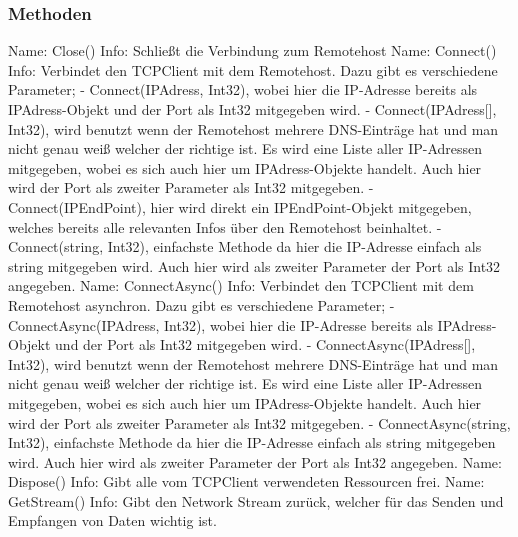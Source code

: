 \subsubsection{Methoden}
Name: Close()
\newline
Info: Schließt die Verbindung zum Remotehost
\newline
\newline
Name: Connect()
\newline
Info: Verbindet den TCPClient mit dem Remotehost. Dazu gibt es verschiedene Parameter; 
\newline \tab \newline
- Connect(IPAdress, Int32), wobei hier die IP-Adresse bereits als IPAdress-Objekt und der Port als Int32 mitgegeben wird.
\newline \tab \newline
- Connect(IPAdress[], Int32), wird benutzt wenn der Remotehost mehrere DNS-Einträge hat und man nicht genau weiß welcher der richtige ist. Es wird eine Liste aller IP-Adressen mitgegeben, wobei es sich auch hier um IPAdress-Objekte handelt. Auch hier wird der Port als zweiter Parameter als Int32 mitgegeben.
\newline \tab \newline
- Connect(IPEndPoint), hier wird direkt ein IPEndPoint-Objekt mitgegeben, welches bereits alle relevanten Infos über den Remotehost beinhaltet.
\newline \tab \newline
- Connect(string, Int32), einfachste Methode da hier die IP-Adresse einfach als string mitgegeben wird. Auch hier wird als zweiter Parameter der Port als Int32 angegeben.
\newline
\newline
Name: ConnectAsync()
Info: Verbindet den TCPClient mit dem Remotehost asynchron. Dazu gibt es verschiedene Parameter; 
\newline \tab \newline
- ConnectAsync(IPAdress, Int32), wobei hier die IP-Adresse bereits als IPAdress-Objekt und der Port als Int32 mitgegeben wird.
\newline \tab \newline
- ConnectAsync(IPAdress[], Int32), wird benutzt wenn der Remotehost mehrere DNS-Einträge hat und man nicht genau weiß welcher der richtige ist. Es wird eine Liste aller IP-Adressen mitgegeben, wobei es sich auch hier um IPAdress-Objekte handelt. Auch hier wird der Port als zweiter Parameter als Int32 mitgegeben.
\newline \tab \newline
- ConnectAsync(string, Int32), einfachste Methode da hier die IP-Adresse einfach als string mitgegeben wird. Auch hier wird als zweiter Parameter der Port als Int32 angegeben.
\newline \newline
Name: Dispose()
\newline
Info: Gibt alle vom TCPClient verwendeten Ressourcen frei.
\newline \newline
Name: GetStream()
\newline
Info: Gibt den Network Stream zurück, welcher für das Senden und Empfangen von Daten wichtig ist.
\newline
